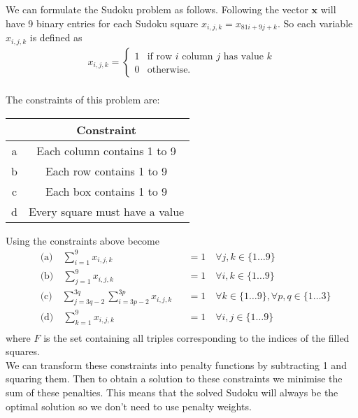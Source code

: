 \documentclass{article}
\begin{document}
\noindent We can formulate the Sudoku problem as follows. Following \cite[p.~1]{mücke2024sudoku} the vector \(\mathbf{x}\) will have 9 binary entries for each Sudoku square \(x_{i,j,k} = x_{81i + 9j + k}\). So each variable \(x_{i,j,k}\) is defined as
\begin{align*}
    x_{i,j,k} = \begin{cases}
        1 & \text{if row \(i\) column \(j\) has value \(k\)} \\
        0 & \text{otherwise.}
    \end{cases}
\end{align*}\\

\noindent The constraints of this problem are:
\begin{center}
\begin{tabular}{ |c|c| } 
 \hline
   & Constraint\\ 
 \hline
 a & Each column contains 1 to 9\\ 
 b & Each row contains 1 to 9\\
 c & Each box contains 1 to 9\\
 d & Every square must have a value\\
 \hline
\end{tabular}
\end{center}

\noindent Using \cite[p.~326]{ILPsudoku} the constraints above become
\begin{align*}
&\text{(a)} \quad \sum_{i=1}^9 x_{i,j,k} &&= 1\quad \forall j,k \in \{1 \dots 9\} \\
&\text{(b)} \quad \sum_{j=1}^9 x_{i,j,k} &&= 1\quad \forall i,k \in \{1 \dots 9\} \\
&\text{(c)} \quad \sum_{j=3q-2}^{3q} \sum_{i=3p-2}^{3p} x_{i,j,k} &&= 1\quad \forall k \in \{1 \dots 9\}, \forall p,q \in \{1 \dots 3\}\\
&\text{(d)} \quad \sum_{k=1}^9 x_{i,j,k} &&= 1\quad \forall i,j \in \{1 \dots 9\} \\
\end{align*}
where \(F\) is the set containing all triples corresponding to the indices of the filled squares. \\

\noindent We can transform these constraints into penalty functions by subtracting 1 and squaring them. Then to obtain a solution to these constraints we minimise the sum of these penalties. This means that the solved Sudoku will always be the optimal solution so we don't need to use penalty weights.\\
\end{document}
